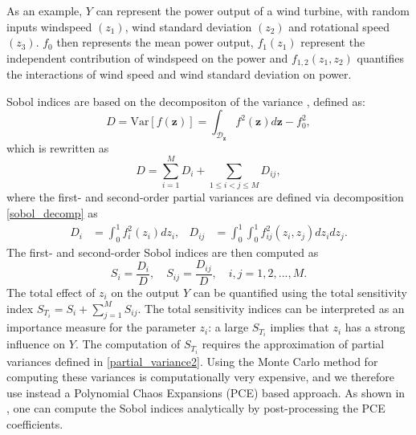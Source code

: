 As an example, $Y$ can represent the power output of a wind turbine, with random inputs windspeed $(z_1)$, wind standard deviation $(z_2)$ and rotational speed $(z_3)$. $f_0$ then represents the mean power output, $f_1(z_1)$ represent the independent contribution of windspeed on the power and $f_{1,2}(z_1,z_2)$ quantifies the interactions of wind speed and wind standard deviation on power. 

Sobol indices are based on the decompositon of the variance \cite{SOBOL2001271}, defined as:
\begin{equation}\label{tot_var}
D = \text{Var}[f(\mathbf{z})] = \int_{\mathcal{D}_{\mathbf{z}}} f^2(\mathbf{z})d\mathbf{z} - f_0^2,
\end{equation}
which is rewritten as
\begin{equation}
D = \sum_{i=1}^M D_i + \sum_{1\leq i<j\leq M} D_{ij},
\end{equation}
where the first- and second-order partial variances are defined via decomposition \eqref{sobol_decomp} as
\begin{align}
D_i &= \int_{0}^{1} f^2_i(z_i)dz_i, & D_{ij} &= \int_{0}^{1} \int_{0}^{1} f^2_{ij}(z_i,z_j)dz_idz_j \label{partial_variance2}. 
\end{align}
The first- and second-order Sobol indices are then computed as
\begin{equation}\label{sobol_ind}
S_i = \frac{D_i}{D}, \quad S_{ij} = \frac{D_{ij}}{D}, \quad i,j=1,2, ..., M.
\end{equation}
The total effect of $z_i$ on the output $Y$ can be quantified using the total sensitivity index $S_{T_i} = S_i + \sum_{j=1}^M S_{ij}$. The total sensitivity indices can be interpreted as an importance measure for the parameter $z_i$: a large $S_{T_i}$ implies that $z_i$ has a strong influence on $Y$. The computation of $S_{T_i}$ requires the approximation of partial variances defined in \eqref{partial_variance2}. Using the Monte Carlo method for computing these variances is computationally very expensive, and we therefore use instead a Polynomial Chaos Expansions (PCE) based approach. As shown in \cite{SUDRET2008964}, one can compute the Sobol indices analytically by post-processing the PCE coefficients.

